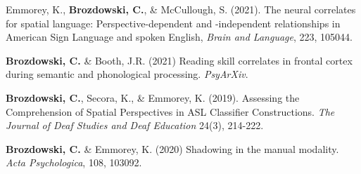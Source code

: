 

\par
\begin{cvparagraphlist}
  Emmorey, K., \textbf{Brozdowski, C.}, \& McCullough, S. (2021). The neural correlates for spatial language: Perspective-dependent and -independent relationships in American Sign Language and spoken English, \textit{Brain and Language}, 223, 105044. \par 
  \textbf{Brozdowski, C.} \& Booth, J.R. (2021) Reading skill correlates in frontal cortex during semantic and phonological processing. \textit{PsyArXiv}. \par 
  \textbf{Brozdowski, C.}, Secora, K., \& Emmorey, K. (2019). Assessing the Comprehension of Spatial Perspectives in ASL Classifier Constructions. \textit{The Journal of Deaf Studies and Deaf Education} 24(3), 214-222. \par 
  \textbf{Brozdowski, C.} \& Emmorey, K. (2020) Shadowing in the manual modality. \textit{Acta Psychologica}, 108, 103092. \par 
\end{cvparagraphlist}

